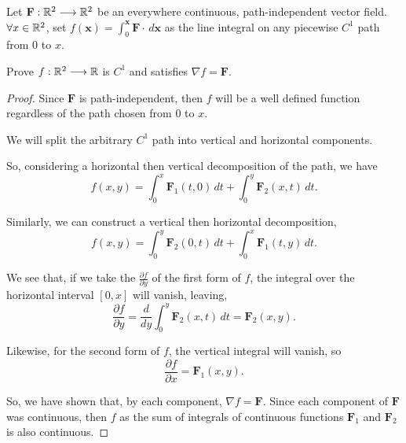 \documentclass[../hw9]{subfiles}
\begin{document}
\begin{problem}[2]
Let $\textbf{F}:\mathbb{R}^2\longrightarrow\mathbb{R}^2$ be an everywhere continuous, path-independent vector field.
$\forall x \in \mathbb{R}^2$, set $f(\textbf{x})=\int_{0}^{\textbf{x}} \textbf{F}\cdot \,d\textbf{x}$ as the line integral on any piecewise $C^1$ path from 0 to $x$.

Prove $f:\mathbb{R}^2\longrightarrow\mathbb{R}$ is $C^1$ and satisfies  $\nabla f = \textbf{F}$.
\end{problem}
\begin{proof}
	Since $\textbf{F}$ is path-independent, then $f$ will be a well defined function regardless of the path chosen from 0 to  $x$.

	We will split the arbitrary $C^1$ path into vertical and horizontal components.

	So, considering a horizontal then vertical decomposition of the path, we have \[
		f(x,y)=\int_{0}^{x} \textbf{F}_1(t,0) \,dt + \int_{0}^{y} \textbf{F}_2(x,t) \,dt
		.\]

	Similarly, we can construct a vertical then horizontal decomposition, \[
		f(x,y)=\int_{0}^{y} \textbf{F}_2(0,t) \,dt + \int_{0}^{x} \textbf{F}_1(t,y) \,dt
		.\]

	We see that, if we take the $\frac{\partial f}{\partial y}$ of the first form of $f$, the integral over the horizontal interval  $[0,x]$ will vanish, leaving, \[
		\frac{\partial f}{\partial y}
		= \frac{d}{dy}\int_{0}^{y} \textbf{F}_2(x,t) \,dt
		= \textbf{F}_2(x,y)
		.\]

	Likewise, for the second form of $f$, the vertical integral will vanish, so  \[
		\frac{\partial f}{\partial x} = \textbf{F}_1(x,y)
		.\]

	So, we have shown that, by each component, $\nabla f = \textbf{F}$. Since each component of $\textbf{F}$ was continuous, then  $f$ as the sum of integrals of continuous functions  $\textbf{F}_1$ and  $\textbf{F}_2$ is also continuous.
\end{proof}
\end{document}
